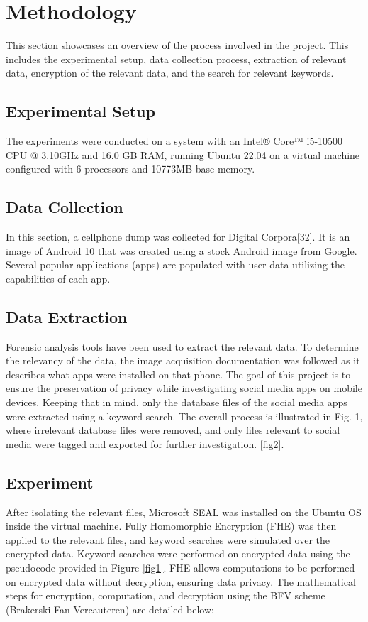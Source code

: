 \documentclass[conference]{IEEEtran}
\begin{document}
\section{Methodology}
This section showcases an overview of the process involved in the project. This includes the experimental setup, data collection process, extraction of relevant data, encryption of the relevant data, and the search for relevant keywords.

\subsection{Experimental Setup}
The experiments were conducted on a system with an Intel® Core™ i5-10500 CPU @ 3.10GHz and 16.0 GB RAM, running Ubuntu 22.04 on a virtual machine configured with 6 processors and 10773MB base memory.

\subsection{Data Collection}
In this section, a cellphone dump was collected for Digital Corpora[32]. It is an image of Android 10 that was created using a stock Android image from Google. Several popular applications (apps) are populated with user data utilizing the capabilities of each app. 

\subsection{Data Extraction}
Forensic analysis tools have been used to extract the relevant data. To determine the relevancy of the data,  the image acquisition documentation was followed as it describes what apps were installed on that phone. The goal of this project is to ensure the preservation of privacy while investigating social media apps on mobile devices. Keeping that in mind, only the database files of the social media apps were extracted using a keyword search. 
The overall process is illustrated in Fig. 1, where irrelevant database files were removed, and only files relevant to social media were tagged and exported for further investigation. \ref{fig2}.

\subsection{Experiment}
After isolating the relevant files, Microsoft SEAL was installed on the Ubuntu OS inside the virtual machine. Fully Homomorphic Encryption (FHE) was then applied to the relevant files, and keyword searches were simulated over the encrypted data. Keyword searches were performed on encrypted data using the pseudocode provided in Figure \ref{fig1}. 
FHE allows computations to be performed on encrypted data without decryption, ensuring data privacy. The mathematical steps for encryption, computation, and decryption using the BFV scheme (Brakerski-Fan-Vercauteren) are detailed below:
\end{document}
